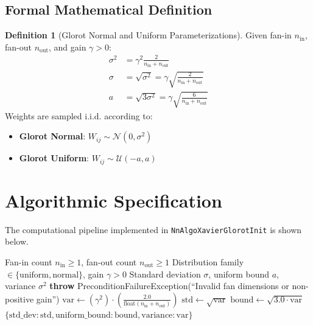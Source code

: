 \documentclass[11pt,a4paper]{article}
\theoremstyle{definition}
\newtheorem{definition}{Definition}[section]
\begin{document}
\subsection{Formal Mathematical Definition}
\begin{definition}[Glorot Normal and Uniform Parameterizations]
Given fan-in $n_{\text{in}}$, fan-out $n_{\text{out}}$, and gain $\gamma > 0$:
\begin{align}
\sigma^2 &= \gamma^2 \frac{2}{n_{\text{in}} + n_{\text{out}}} \label{eq:glorot_var} \\
\sigma &= \sqrt{\sigma^2} = \gamma \sqrt{\frac{2}{n_{\text{in}} + n_{\text{out}}}} \label{eq:glorot_normal} \\
a &= \sqrt{3 \sigma^2} = \gamma \sqrt{\frac{6}{n_{\text{in}} + n_{\text{out}}}} \label{eq:glorot_uniform}
\end{align}
Weights are sampled i.i.d. according to:
\begin{itemize}
    \item \textbf{Glorot Normal}: $W_{ij} \sim \mathcal{N}\left(0, \sigma^2\right)$
    \item \textbf{Glorot Uniform}: $W_{ij} \sim \mathcal{U}\left(-a, a\right)$
\end{itemize}
\end{definition}

\section{Algorithmic Specification}

The computational pipeline implemented in \texttt{NnAlgoXavierGlorotInit} is shown below.

\begin{algorithm}[H]
\caption{Xavier / Glorot Initialization Statistics Computation}
\begin{algorithmic}[1]
\Require Fan-in count $n_{\text{in}} \ge 1$, fan-out count $n_{\text{out}} \ge 1$
\Require Distribution family $\in \{\text{uniform}, \text{normal}\}$, gain $\gamma > 0$
\Ensure Standard deviation $\sigma$, uniform bound $a$, variance $\sigma^2$
    \State \textbf{throw} PreconditionFailureException(``Invalid fan dimensions or non-positive gain'')
\EndIf
\State $\text{var} \gets (\gamma^2) \cdot \left(\frac{2.0}{\text{float}(n_{\text{in}} + n_{\text{out}})}\right)$
\State $\text{std} \gets \sqrt{\text{var}}$
\State $\text{bound} \gets \sqrt{3.0 \cdot \text{var}}$
\State \Return $\{\text{std\_dev}: \text{std}, \text{uniform\_bound}: \text{bound}, \text{variance}: \text{var}\}$
\end{algorithmic}
\end{algorithm}
\end{document}
